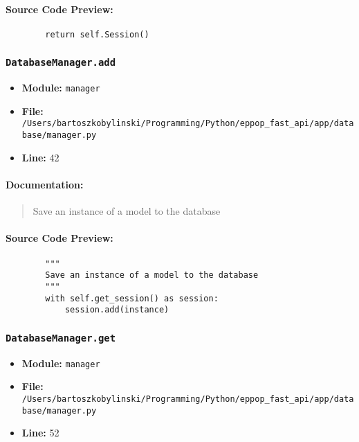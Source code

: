 \documentclass[11pt,a4paper]{article}
\begin{document}
\paragraph{Source Code Preview:}
\begin{verbatim}
        return self.Session()
\end{verbatim}

\vspace{1em}
\subsubsection{\texttt{DatabaseManager.add}}

\begin{itemize}
    \item \textbf{Module:} \texttt{manager}
    \item \textbf{File:} \texttt{/Users/bartoszkobylinski/Programming/Python/eppop\_fast\_api/app/database/manager.py}
    \item \textbf{Line:} 42
\end{itemize}

\paragraph{Documentation:}
\begin{quote}
Save an instance of a model to the database
\end{quote}

\paragraph{Source Code Preview:}
\begin{verbatim}
        """
        Save an instance of a model to the database
        """
        with self.get_session() as session:
            session.add(instance)
\end{verbatim}

\vspace{1em}
\subsubsection{\texttt{DatabaseManager.get}}

\begin{itemize}
    \item \textbf{Module:} \texttt{manager}
    \item \textbf{File:} \texttt{/Users/bartoszkobylinski/Programming/Python/eppop\_fast\_api/app/database/manager.py}
    \item \textbf{Line:} 52
\end{itemize}
\end{document}
